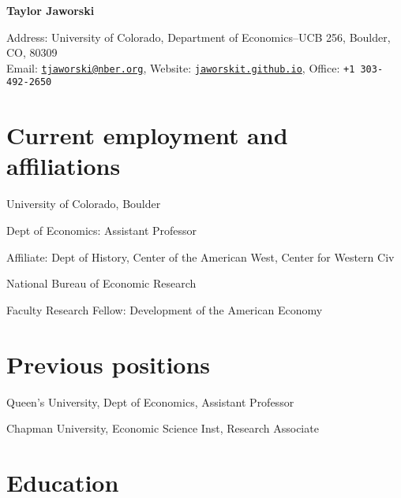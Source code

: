 \documentclass[11pt,letterpaper]{article}
\begin{document}
\textbf{\LARGE Taylor Jaworski} 


{\large Address: University of Colorado, Department of Economics--UCB 256, Boulder, CO, 80309} \vspace{.25em} \\ 
{\large Email: \href{tjaworski@nber.org}{\color{black} \tt tjaworski@nber.org}, Website: 
\href{https://jaworskit.github.io/}{\color{black} \tt jaworskit.github.io}, Office:
{\color{black}\tt +1 303-492-2650}}

\vspace{-1em}
\section*{Current employment and affiliations}

\begin{description}[leftmargin=.75in,itemsep=.25em,itemindent=0in]
	\item[2017 - ] University of Colorado, Boulder
	\item[]			\hspace{.1in}Dept of Economics: Assistant Professor
	\item[]			\hspace{.1in}Affiliate: Dept of History, Center of the American West, Center for Western Civ
	\item[2016 - ]	National Bureau of Economic Research
	\item[]			\hspace{.1in}Faculty Research Fellow: Development of the American Economy
\end{description}

\vspace{-1em}
\section*{Previous positions}

\begin{description}[leftmargin=.75in,itemsep=.25em,itemindent=0in]
	\item[2014 - 17] 	Queen's University, Dept of Economics, Assistant Professor
	\item[2008 - 09] 	Chapman University, Economic Science Inst, Research Associate
\end{description}

\vspace{-1em}
\section*{Education}
\end{document}
